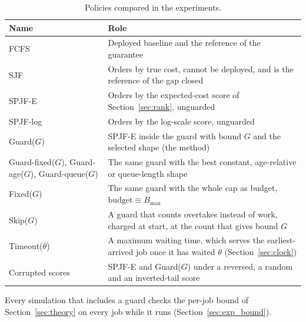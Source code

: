 \begin{table}[htbp]
\centering
\caption{Policies compared in the experiments.}
\label{tab:policies}
\small
\begin{tabular}{p{}p{}}
\toprule
Name & Role \\
\midrule
FCFS & Deployed baseline and the reference of the guarantee \\
SJF & Orders by true cost, cannot be deployed, and is the reference of the gap closed \\
SPJF-E & Orders by the expected-cost score of Section~\ref{sec:rank}, unguarded \\
SPJF-log & Orders by the log-scale score, unguarded \\
Guard($G$) & SPJF-E inside the guard with bound $G$ and the selected shape (the method) \\
Guard-fixed($G$), Guard-age($G$), Guard-queue($G$) & The same guard with the best constant, age-relative or queue-length shape \\
Fixed($G$) & The same guard with the whole cap as budget, $\mathrm{budget} \equiv B_{\max}$ \\
Skip($G$) & A guard that counts overtakes instead of work, charged at start, at the count that gives bound $G$ \\
Timeout($\theta$) & A maximum waiting time, which serves the earliest-arrived job once it has waited $\theta$ (Section~\ref{sec:clock}) \\
Corrupted scores & SPJF-E and Guard($G$) under a reversed, a random and an inverted-tail score \\
\bottomrule
\end{tabular}
\end{table}

Every simulation that includes a guard checks the per-job bound of
Section~\ref{sec:theory} on every job while it runs (Section~\ref{sec:exp_bound}).
